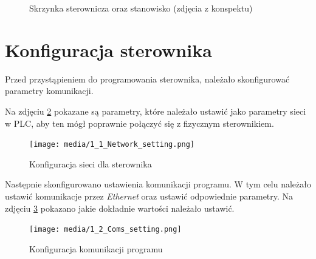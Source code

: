 \documentclass{article}
\begin{document}
\begin{figure}[H]
    \centering
    \caption{Skrzynka sterownicza oraz stanowisko (zdjęcia z konspektu)}
    \label{fig:main0}
\end{figure}


\newpage
\section{Konfiguracja sterownika}
Przed przystąpieniem do programowania sterownika, należało skonfigurować parametry komunikacji. 

Na zdjęciu \ref{fig:zdj3} pokazane są parametry, które należało ustawić jako parametry sieci w PLC, aby ten mógł poprawnie połączyć się z fizycznym sterownikiem.

\begin{figure}[H]
    \centering
    \texttt{[image: media/1\_1\_Network\_setting.png]}
    \caption{Konfiguracja sieci dla sterownika}
    \label{fig:zdj3}
\end{figure}


Następnie skonfigurowano ustawienia komunikacji programu. W tym celu należało ustawić komunikacje przez \textit{Ethernet} oraz ustawić odpowiednie parametry. Na zdjęciu \ref{fig:zdj4} pokazano jakie dokładnie wartości należało ustawić.
\begin{figure}[H]
    \centering
    \texttt{[image: media/1\_2\_Coms\_setting.png]}
    \caption{Konfiguracja komunikacji programu}
    \label{fig:zdj4}
\end{figure}
\end{document}

